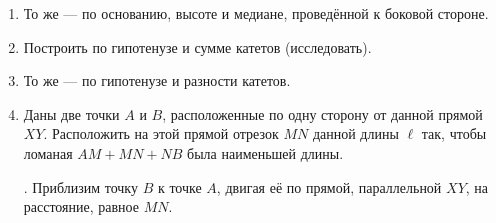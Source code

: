 \begin{enumerate}[resume]
\item
То же — по основанию, высоте и медиане, проведённой к боковой стороне.

\item
Построить  по гипотенузе и сумме катетов (исследовать).

\item
То же — по гипотенузе и разности катетов.

\item
Даны две точки $A$ и $B$, расположенные по одну сторону от данной прямой $XY$.
Расположить на этой прямой отрезок $MN$ данной длины $\ell$ так, чтобы ломаная $AM+MN+NB$ была наименьшей длины.

\smallskip
{}.
Приблизим точку $B$ к точке $A$, двигая её по прямой, параллельной $XY$, на расстояние, равное $MN$.

\end{enumerate}